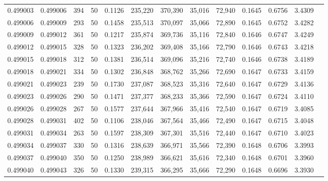 \begin{tabular}{rrrrrrrrrrrrr}
0.499003 & 0.499006 & 394 &  50 &                                     0.1126 & 235,220 & 370,390 &  35,016 &  72,940 & 0.1645 & 0.6756 & 3.4309 \\
0.499006 & 0.499009 & 293 &  50 &                                     0.1458 & 235,513 & 370,097 &  35,066 &  72,890 & 0.1645 & 0.6752 & 3.4282 \\
0.499009 & 0.499012 & 361 &  50 &                                     0.1217 & 235,874 & 369,736 &  35,116 &  72,840 & 0.1646 & 0.6747 & 3.4249 \\
0.499012 & 0.499015 & 328 &  50 &                                     0.1323 & 236,202 & 369,408 &  35,166 &  72,790 & 0.1646 & 0.6743 & 3.4218 \\
0.499015 & 0.499018 & 312 &  50 &                                     0.1381 & 236,514 & 369,096 &  35,216 &  72,740 & 0.1646 & 0.6738 & 3.4189 \\
0.499018 & 0.499021 & 334 &  50 &                                     0.1302 & 236,848 & 368,762 &  35,266 &  72,690 & 0.1647 & 0.6733 & 3.4159 \\
0.499021 & 0.499023 & 239 &  50 &                                     0.1730 & 237,087 & 368,523 &  35,316 &  72,640 & 0.1647 & 0.6729 & 3.4136 \\
0.499023 & 0.499026 & 290 &  50 &                                     0.1471 & 237,377 & 368,233 &  35,366 &  72,590 & 0.1647 & 0.6724 & 3.4110 \\
0.499026 & 0.499028 & 267 &  50 &                                     0.1577 & 237,644 & 367,966 &  35,416 &  72,540 & 0.1647 & 0.6719 & 3.4085 \\
0.499028 & 0.499031 & 402 &  50 &                                     0.1106 & 238,046 & 367,564 &  35,466 &  72,490 & 0.1647 & 0.6715 & 3.4048 \\
0.499031 & 0.499034 & 263 &  50 &                                     0.1597 & 238,309 & 367,301 &  35,516 &  72,440 & 0.1647 & 0.6710 & 3.4023 \\
0.499034 & 0.499037 & 330 &  50 &                                     0.1316 & 238,639 & 366,971 &  35,566 &  72,390 & 0.1648 & 0.6706 & 3.3993 \\
0.499037 & 0.499040 & 350 &  50 &                                     0.1250 & 238,989 & 366,621 &  35,616 &  72,340 & 0.1648 & 0.6701 & 3.3960 \\
0.499040 & 0.499043 & 326 &  50 &                                     0.1330 & 239,315 & 366,295 &  35,666 &  72,290 & 0.1648 & 0.6696 & 3.3930 \\

\end{tabular}
